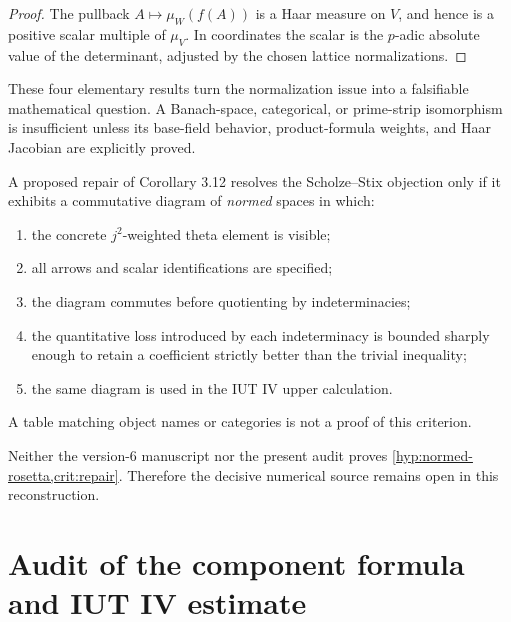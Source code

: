 \begin{proof}
The pullback $A\mapsto\mu_W(f(A))$ is a Haar measure on $V$, and hence is a
positive scalar multiple of $\mu_V$.  In coordinates the scalar is the
$p$-adic absolute value of the determinant, adjusted by the chosen lattice
normalizations.
\end{proof}

These four elementary results turn the normalization issue into a falsifiable
mathematical question.  A Banach-space, categorical, or prime-strip
isomorphism is insufficient unless its base-field behavior, product-formula
weights, and Haar Jacobian are explicitly proved.

\begin{criterion}\label{crit:repair}
A proposed repair of Corollary 3.12 resolves the Scholze--Stix objection only if it exhibits a commutative diagram of \emph{normed} spaces in which:
\begin{enumerate}[label=(\roman*)]
\item the concrete $j^2$-weighted theta element is visible;
\item all arrows and scalar identifications are specified;
\item the diagram commutes before quotienting by indeterminacies;
\item the quantitative loss introduced by each indeterminacy is bounded sharply enough to retain a coefficient strictly better than the trivial inequality;
\item the same diagram is used in the IUT IV upper calculation.
\end{enumerate}
A table matching object names or categories is not a proof of this criterion.
\end{criterion}

\begin{audit}
Neither the version-6 manuscript nor the present audit proves \cref{hyp:normed-rosetta,crit:repair}.  Therefore the decisive numerical source remains open in this reconstruction.
\end{audit}

\section{Audit of the component formula and IUT IV estimate}
